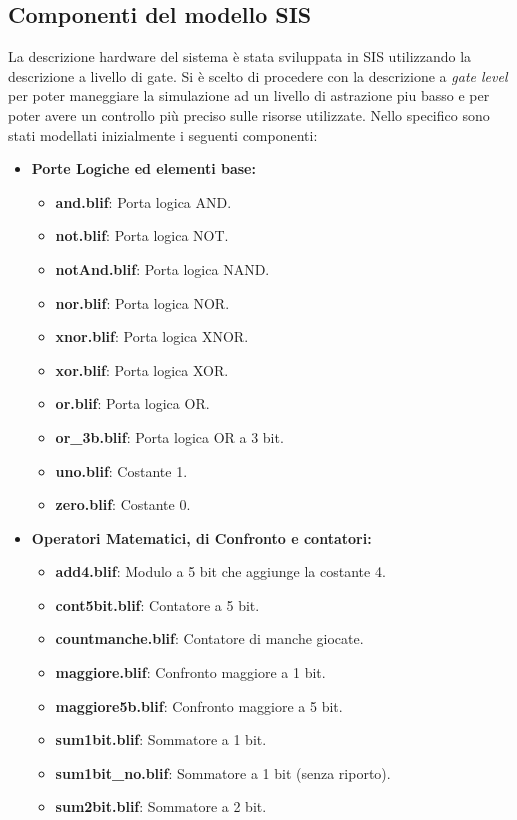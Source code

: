 \documentclass[a4paper]{report}
\begin{document}
\subsection*{Componenti del modello SIS}\label{subsec:component}

La descrizione hardware del sistema è stata sviluppata in SIS utilizzando la descrizione a livello di gate.
Si è scelto di procedere con la descrizione a \textit{gate level} per poter maneggiare la simulazione ad un livello di astrazione piu basso e per poter avere un controllo più preciso sulle risorse utilizzate.
Nello specifico sono stati modellati inizialmente i seguenti componenti:
\vspace*{10pt}

\small
\begin{itemize}
    \item \textbf{Porte Logiche ed elementi base:}
    \begin{itemize}
        \item \textbf{and.blif}: Porta logica AND.
        \item \textbf{not.blif}: Porta logica NOT.
        \item \textbf{notAnd.blif}: Porta logica NAND.
        \item \textbf{nor.blif}: Porta logica NOR.
        \item \textbf{xnor.blif}: Porta logica XNOR.
        \item \textbf{xor.blif}: Porta logica XOR.
        \item \textbf{or.blif}: Porta logica OR.
        \item \textbf{or\_3b.blif}: Porta logica OR a 3 bit.
        \item \textbf{uno.blif}: Costante 1.
        \item \textbf{zero.blif}: Costante 0.
    \end{itemize}
    
    \item \textbf{Operatori Matematici, di Confronto e contatori:}
    \begin{itemize}
        \item \textbf{add4.blif}: Modulo a 5 bit che aggiunge la costante 4.
        \item \textbf{cont5bit.blif}: Contatore a 5 bit.
        \item \textbf{countmanche.blif}: Contatore di manche giocate.
        \item \textbf{maggiore.blif}: Confronto maggiore a 1 bit.
        \item \textbf{maggiore5b.blif}: Confronto maggiore a 5 bit.
        \item \textbf{sum1bit.blif}: Sommatore a 1 bit.
        \item \textbf{sum1bit\_no.blif}: Sommatore a 1 bit (senza riporto).
        \item \textbf{sum2bit.blif}: Sommatore a 2 bit.
    \end{itemize}
    

\end{itemize}
\end{document}
